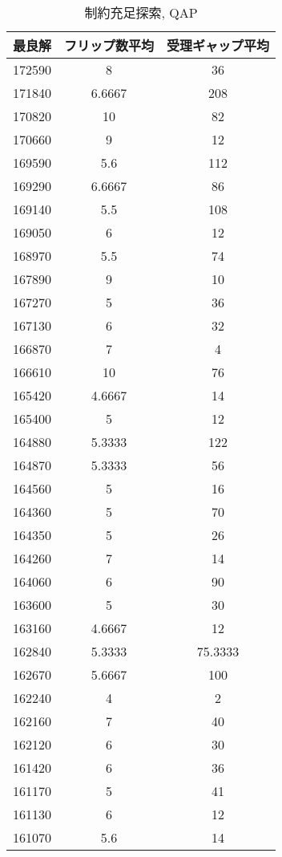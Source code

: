 \begin{table}[htbp]
  \centering
  \caption{制約充足探索, QAP}
  \begin{tabular}{ccc}
    \hline
    最良解 & フリップ数平均 & 受理ギャップ平均 \\
    \hline
172590 & 8      & 36      \\
171840 & 6.6667 & 208     \\
170820 & 10     & 82      \\
170660 & 9      & 12      \\
169590 & 5.6    & 112     \\
169290 & 6.6667 & 86      \\
169140 & 5.5    & 108     \\
169050 & 6      & 12      \\
168970 & 5.5    & 74      \\
167890 & 9      & 10      \\
167270 & 5      & 36      \\
167130 & 6      & 32      \\
166870 & 7      & 4       \\
166610 & 10     & 76      \\
165420 & 4.6667 & 14      \\
165400 & 5      & 12      \\
164880 & 5.3333 & 122     \\
164870 & 5.3333 & 56      \\
164560 & 5      & 16      \\
164360 & 5      & 70      \\
164350 & 5      & 26      \\
164260 & 7      & 14      \\
164060 & 6      & 90      \\
163600 & 5      & 30      \\
163160 & 4.6667 & 12      \\
162840 & 5.3333 & 75.3333 \\
162670 & 5.6667 & 100     \\
162240 & 4      & 2       \\
162160 & 7      & 40      \\
162120 & 6      & 30      \\
161420 & 6      & 36      \\
161170 & 5      & 41      \\
161130 & 6      & 12      \\
161070 & 5.6    & 14      \\

\end{tabular}
\end{table}
